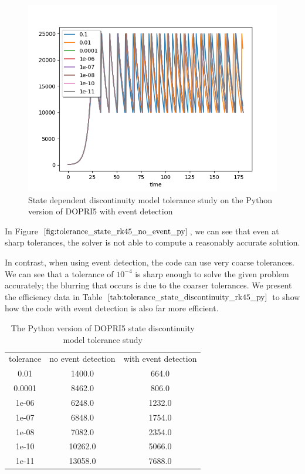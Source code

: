 \begin{figure}[h]
\centering
\includegraphics[width=0.7\linewidth]{./figures/tolerance_state_rk45_with_event_py}
\caption{State dependent discontinuity model tolerance study on the Python version of DOPRI5 with event detection}
\label{fig:tolerance_state_rk45_with_event_py}
\end{figure}

In Figure $\ref{fig:tolerance_state_rk45_no_event_py}$, we can see that even at sharp tolerances, the solver is not able to compute a reasonably accurate solution.

In contrast, when using event detection, the code can use very coarse tolerances. We can see that a tolerance of $10^{-4}$ is sharp enough to solve the given problem accurately; the blurring that occurs is due to the coarser tolerances. We present the efficiency data in Table $\ref{tab:tolerance_state_discontinuity_rk45_py}$ to show how the code with event detection is also far more efficient.

\begin{table}[h]
\caption {The Python version of DOPRI5 state discontinuity model tolerance study} \label{tab:tolerance_state_discontinuity_rk45_py} 
\begin{center}
\begin{tabular}{ c c c }
tolerance & no event detection & with event detection \\
0.01 & 1400.0 & 664.0 \\
0.0001 & 8462.0 & 806.0 \\
1e-06 & 6248.0 & 1232.0 \\
1e-07 & 6848.0 & 1754.0 \\
1e-08 & 7082.0 & 2354.0 \\
1e-10 & 10262.0 & 5066.0 \\
1e-11 & 13058.0 & 7688.0 \\
\end{tabular}
\end{center}
\end{table}

